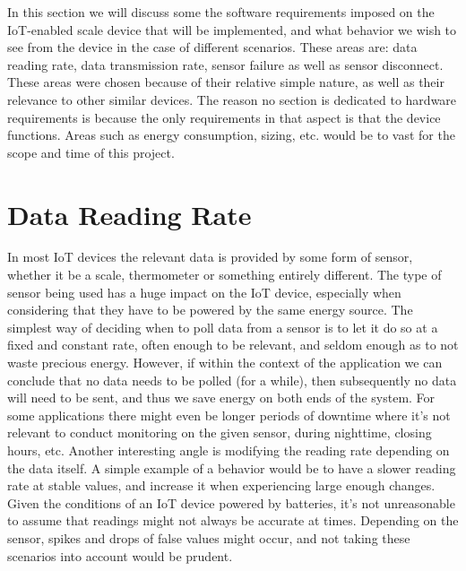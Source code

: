 





In this section we will discuss some the software requirements imposed on the IoT-enabled scale device that will be implemented, and what behavior we wish to see from the device in the case of different scenarios. These areas are: data reading rate, data transmission rate, sensor failure as well as sensor disconnect. These areas were chosen because of their relative simple nature, as well as their relevance to other similar devices. The reason no section is dedicated to hardware requirements is because the only requirements in that aspect is that the device functions. Areas such as energy consumption, sizing, etc. would be to vast for the scope and time of this project.

\section{Data Reading Rate}
In most IoT devices the relevant data is provided by some form of sensor, whether it be a scale, thermometer or something entirely different.\cite{what_is_iot} The type of sensor being used has a huge impact on the IoT device, especially when considering that they have to be powered by the same energy source. The simplest way of deciding when to poll data from a sensor is to let it do so at a fixed and constant rate, often enough to be relevant, and seldom enough as to not waste precious energy. However, if within the context of the application we can conclude that no data needs to be polled (for a while), then subsequently no data will need to be sent, and thus we save energy on both ends of the system. For some applications there might even be longer periods of downtime where it's not relevant to conduct monitoring on the given sensor, \eg during nighttime, closing hours, etc. Another interesting angle is modifying the reading rate depending on the data itself. A simple example of a behavior would be to have a slower reading rate at stable values, and increase it when experiencing large enough changes. Given the conditions of an IoT device powered by batteries, it's not unreasonable to assume that readings might not always be accurate at times. Depending on the sensor, spikes and drops of false values might occur, and not taking these scenarios into account would be prudent. 

